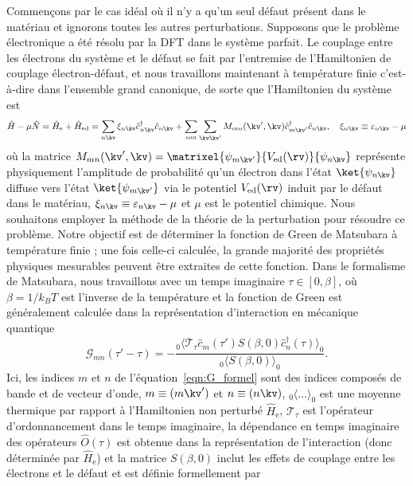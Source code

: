 Commençons par le cas idéal où il n'y a qu'un seul défaut présent dans le matériau et ignorons toutes les autres perturbations. Supposons que le problème électronique a été résolu par la DFT dans le système parfait. Le couplage entre les électrons du système et le défaut se fait par l'entremise de l'Hamiltonien de couplage électron-défaut, et nous travaillons maintenant à température finie c'est-à-dire dans l'ensemble grand canonique, de sorte que l'Hamiltonien du système est
\begin{equation}
    \hat{H}-\mu\hat{N} = \hat{H}_\text{e}+\hat{H}_\text{ed} = \sum_{n\kv}\xi_{n\kv}\hat{c}^\dag_{n\kv}\hat{c}_{n\kv}+\sum_{nm}\sum_{\kv\kv'}M_{mn}(\kv',\kv)\hat{c}^\dag_{m\kv'}\hat{c}_{n\kv},\quad\xi_{n\kv} \equiv \varepsilon_{n\kv}-\mu
\end{equation}
où la matrice $M_{mn}(\kv',\kv)=\matrixel{\psi_{m\kv'}}{V_\text{ed}(\rv)}{\psi_{n\kv}}$ représente physiquement l'amplitude de probabilité qu'un électron dans l'état $\ket{\psi_{n\kv}}$ diffuse vers l'état $\ket{\psi_{m\kv'}}$ via le potentiel $V_\text{ed}(\rv)$ induit par le défaut dans le matériau, $\xi_{n\kv}\equiv\varepsilon_{ n\kv}-\mu$ et $\mu$ est le potentiel chimique. Nous souhaitons employer la méthode de la théorie de la perturbation pour résoudre ce problème. Notre objectif est de déterminer la fonction de Green de Matsubara à température finie ; une fois celle-ci calculée, la grande majorité des propriétés physiques mesurables peuvent être extraites de cette fonction. Dans le formalisme de Matsubara, nous travaillons avec un temps imaginaire $\tau\in[0,\beta]$, où $\beta=1/k_BT$ est l'inverse de la température et la fonction de Green est généralement calculée dans la représentation d'interaction en mécanique quantique~\cite{mahanManyParticlePhysics2000}
\begin{equation}
    \mathcal{G}_{mn}(\tau'-\tau) = -\frac{{}_0\langle\mathcal{T}_\tau\hat{c}_m(\tau')S(\beta,0)\hat{c}
    _n^\dag(\tau)\rangle_0}{{}_0\langle S(\beta,0)\rangle_0}.\label{eqn:G_formel}
\end{equation}
Ici, les indices $m$ et $n$ de l'équation~\eqref{eqn:G_formel} sont des indices composés de bande et de vecteur d'onde, $m\equiv(m\kv')$ et $n\equiv(n\kv)$, ${}_0\langle\dots\rangle_0$ est une moyenne thermique par rapport à l'Hamiltonien non perturbé $\hat{H}_\text{e}$, $\mathcal{T}_\tau$ est l'opérateur d'ordonnancement dans le temps imaginaire, la dépendance en temps imaginaire des opérateurs $\hat{O}(\tau)$ est obtenue dans la représentation de l'interaction (donc déterminée par $\hat{H}_\text{e}$) et la matrice $S(\beta, 0)$ inclut les effets de couplage entre les électrons et le défaut et est définie formellement par
